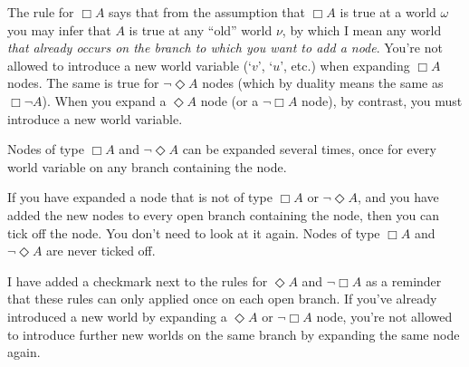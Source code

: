 The rule for $\Box A$ says that from the assumption that $\Box A$ is true at a
world $\omega$ you may infer that $A$ is true at any ``old'' world $\nu$, by
which I mean any world \emph{that already occurs on the branch to which you want to add a node}. You're not allowed to introduce a new world variable (`$v$',
`$u$', etc.) when expanding $\Box A$ nodes. The same is true for
$\neg \Diamond A$ nodes (which by duality means the same as $\Box \neg A$). When
you expand a $\Diamond A$ node (or a $\neg \Box A$ node), by contrast, you must
introduce a new world variable.

Nodes of type $\Box A$ and $\neg \Diamond A$ can be expanded several times, once
for every world variable on any branch containing the node.

If you have expanded a node that is not of type $\Box A$ or $\neg \Diamond A$,
and you have added the new nodes to every open branch containing the node, then
you can tick off the node. You don't need to look at it again. Nodes of type
$\Box A$ and $\neg \Diamond A$ are never ticked off.

I have added a checkmark next to the rules for $\Diamond A$ and $\neg \Box A$ as
a reminder that these rules can only applied once on each open branch. If you've
already introduced a new world by expanding a $\Diamond A$ or $\neg \Box A$
node, you're not allowed to introduce further new worlds on the same branch by
expanding the same node again.

